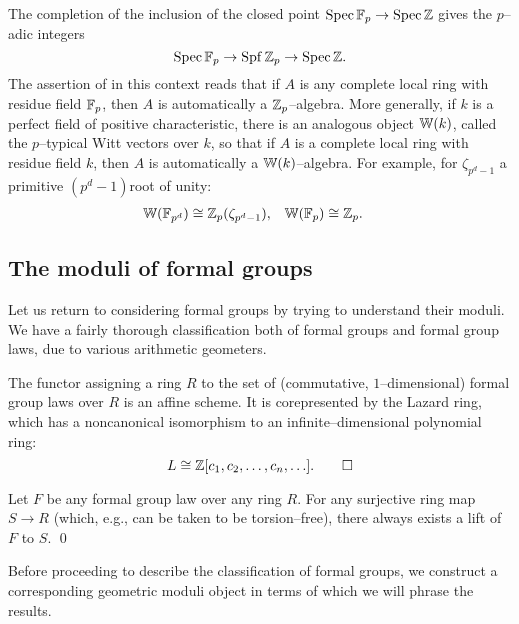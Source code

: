 \begin{example}
The completion of the inclusion of the closed point $\operatorname{Spec} \mathbb F_p \to \operatorname{Spec} \mathbb Z$ gives the $p$--adic integers \[\operatorname{Spec} \mathbb F_p \to \operatorname{Spf} \mathbb Z_p \to \operatorname{Spec} \mathbb Z.\] The assertion of  in this context reads that if $A$ is any complete local ring with residue field $\mathbb F_p$, then $A$ is automatically a $\mathbb Z_p$--algebra.  More generally, if $k$ is a perfect field of positive characteristic, there is an analogous object $\mathbb W(k)$, called the $p$--typical Witt vectors over $k$, so that if $A$ is a complete local ring with residue field $k$, then $A$ is automatically a $\mathbb W(k)$--algebra.  For example, for $\zeta_{p^d-1}$ a primitive $(p^d-1)$\th root of unity:
\begin{align*}
\mathbb W(\mathbb F_{p^d}) & \cong \mathbb Z_p(\zeta_{p^d-1}), & \mathbb W(\mathbb F_p) & \cong \mathbb Z_p.
\end{align*}
\end{example}

\subsection{The moduli of formal groups}

Let us return to considering formal groups by trying to understand their moduli.  We have a fairly thorough classification both of formal groups and formal group laws, due to various arithmetic geometers.

\begin{theorem}\label{DefnLazardRing}
The functor assigning a ring $R$ to the set of (commutative, $1$--dimensional) formal group laws over $R$ is an affine scheme.  It is corepresented by the Lazard ring, which has a noncanonical isomorphism to an infinite--dimensional polynomial ring: \[L \cong \mathbb Z[c_1, c_2, \ldots, c_n, \ldots]. \qed\]
\end{theorem}

\begin{corollary}\label{TorsionFreeLifts}
Let $F$ be any formal group law over any ring $R$.  For any surjective ring map $S \to R$ (which, e.g., can be taken to be torsion--free), there always exists a lift of $F$ to $S$. \qed
\end{corollary}

Before proceeding to describe the classification of formal groups, we construct a corresponding geometric moduli object in terms of which we will phrase the results.

